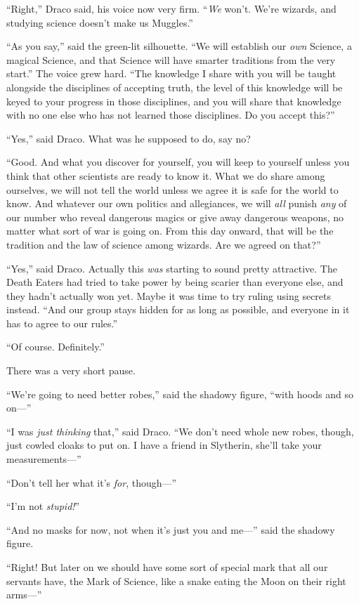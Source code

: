 “Right,” Draco said, his voice now very firm. “\emph{We} won’t. We’re wizards, and studying science doesn’t make us Muggles.”

“As you say,” said the green-lit silhouette. “We will establish our \emph{own} Science, a magical Science, and that Science will have smarter traditions from the very start.” The voice grew hard. “The knowledge I share with you will be taught alongside the disciplines of accepting truth, the level of this knowledge will be keyed to your progress in those disciplines, and you will share that knowledge with no one else who has not learned those disciplines. Do you accept this?”

“Yes,” said Draco. What was he supposed to do, say no?

“Good. And what you discover for yourself, you will keep to yourself unless you think that other scientists are ready to know it. What we do share among ourselves, we will not tell the world unless we agree it is safe for the world to know. And whatever our own politics and allegiances, we will \emph{all} punish \emph{any} of our number who reveal dangerous magics or give away dangerous weapons, no matter what sort of war is going on. From this day onward, that will be the tradition and the law of science among wizards. Are we agreed on that?”

“Yes,” said Draco. Actually this \emph{was} starting to sound pretty attractive. The Death Eaters had tried to take power by being scarier than everyone else, and they hadn’t actually won yet. Maybe it was time to try ruling using secrets instead. “And our group stays hidden for as long as possible, and everyone in it has to agree to our rules.”

“Of course. Definitely.”

There was a very short pause.

“We’re going to need better robes,” said the shadowy figure, “with hoods and so on—”

“I was \emph{just thinking} that,” said Draco. “We don’t need whole new robes, though, just cowled cloaks to put on. I have a friend in Slytherin, she’ll take your measurements—”

“Don’t tell her what it’s \emph{for}, though—”

“I’m not \emph{stupid!}”

“And no masks for now, not when it’s just you and me—” said the shadowy figure.

“Right! But later on we should have some sort of special mark that all our servants have, the Mark of Science, like a snake eating the Moon on their right arms—”

